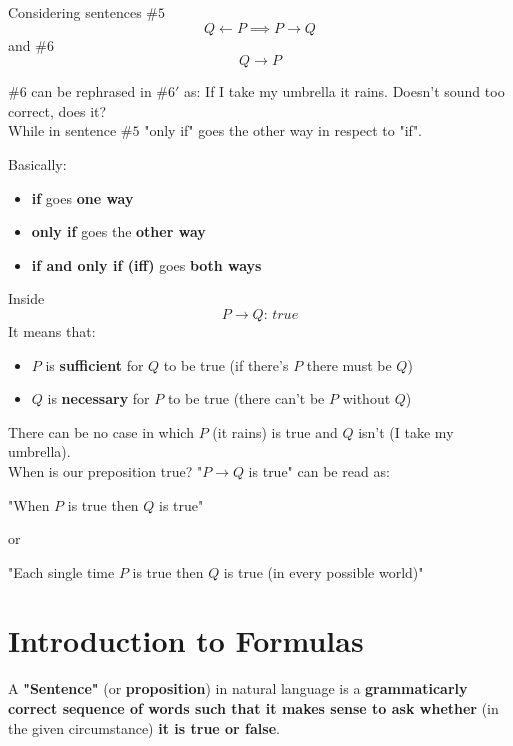 	Considering sentences  $\#5$
	$$ Q \leftarrow P \implies P \rightarrow Q $$
	and $\#6$
	$$ Q \rightarrow P$$

	$\# 6$ can be rephrased in $\# 6'$ as: If I take my umbrella it rains. Doesn't sound too correct, does it?\\
	While in sentence $\#5$ "only if" goes the other way in respect to "if".\\

	\newpage

	Basically:
	\begin{itemize}
		\item \textbf{if} goes \textbf{one way}
		\item \textbf{only if} goes the \textbf{other way}
		\item \textbf{if and only if (iff)} goes \textbf{both ways}
	\end{itemize}

	Inside
	$$ P \rightarrow Q: \, true$$
	It means that:
	\begin{itemize}
		\item $P$ is \textbf{sufficient} for $Q$ to be true (if there's $P$ there must be $Q$)
		\item $Q$ is \textbf{necessary} for $P$ to be true (there can't be $P$ without $Q$)
	\end{itemize}
	There can be no case in which $P$ (it rains) is true and $Q$ isn't (I take my umbrella).\\

	When is our preposition true? "$P \rightarrow Q$ is true" can be read as:
	\begin{center}
		"When $P$ is true then $Q$ is true"
	\end{center}
	 or
	 \begin{center}
	 	"Each single time $P$ is true then $Q$ is true (in every possible world)"
	 \end{center}


	\newpage

	\chapter{Introduction to Formulas}
	A \textbf{"Sentence"} (or \textbf{proposition}) in natural language is a \textbf{grammaticarly correct sequence of words such that it makes sense to ask whether} (in the given circumstance) \textbf{it is true or false}.

